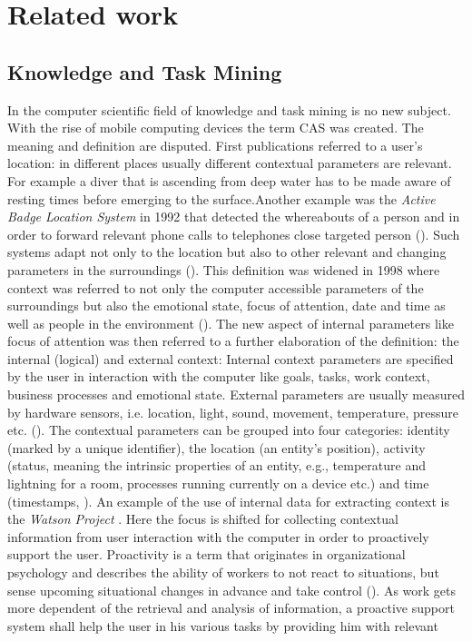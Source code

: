 
\chapter{Related work}
\label{relatedwork}
\section{Knowledge and Task Mining}
\label{knowledgeandtask}
In the computer scientific field of knowledge and task mining is no new subject. With the rise of mobile computing devices the term \ac{CAS} was created. The meaning and definition are disputed. First publications referred to a user's location: in different places usually different contextual parameters are relevant. For example a diver that is ascending from deep water has to be made aware of resting times before emerging to the surface.Another example was the \textit{Active Badge Location System} in 1992 that detected the whereabouts of a person and in order to forward relevant phone calls to telephones close targeted person (\cite{want1992active}). Such systems adapt not only to the location but also to other relevant and changing parameters in the surroundings (\cite{schilit1994context}). This definition was widened in 1998 where context was referred to not only the computer accessible parameters of the surroundings but also the emotional state, focus of attention, date and time as well as people in the environment (\cite{dey1998context}). The new aspect of internal parameters like focus of attention was then referred to a further elaboration of the definition: the internal (logical) and external context: Internal context parameters are specified by the user in interaction with the computer like goals, tasks, work context, business processes and emotional state. External parameters are usually measured by hardware sensors, i.e. location, light, sound, movement, temperature, pressure etc. (\cite{hofer2003context}). The contextual parameters can be grouped into four categories: identity (marked by a unique identifier), the location (an entity’s position), activity (status, meaning the intrinsic properties of an entity, e.g., temperature and lightning for a room, processes running currently on a device etc.) and time (timestamps, \cite{dey2001conceptual}). An example of the use of internal data for extracting context is the \textit{Watson Project} \cite{budzik2000user}. Here the focus is shifted for collecting contextual information from user interaction with the computer in order to proactively support the user. Proactivity is a term that  originates in organizational psychology and describes the ability of workers to not react to situations, but sense upcoming situational changes in advance and take control (\cite{grant2008dynamics}). As work gets more dependent of the retrieval and analysis of information, a proactive support system shall help the user in his various tasks by providing him with relevant 